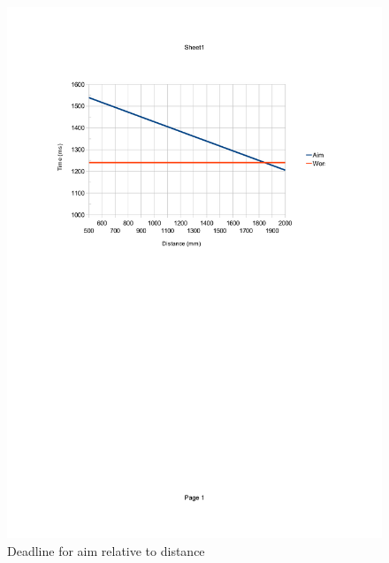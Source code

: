 \begin{figure}
	\includegraphics[scale=0.5]{img/deadline.pdf}
	\caption{Deadline for aim relative to distance}
	\label{fig:deadline}
\end{figure}
